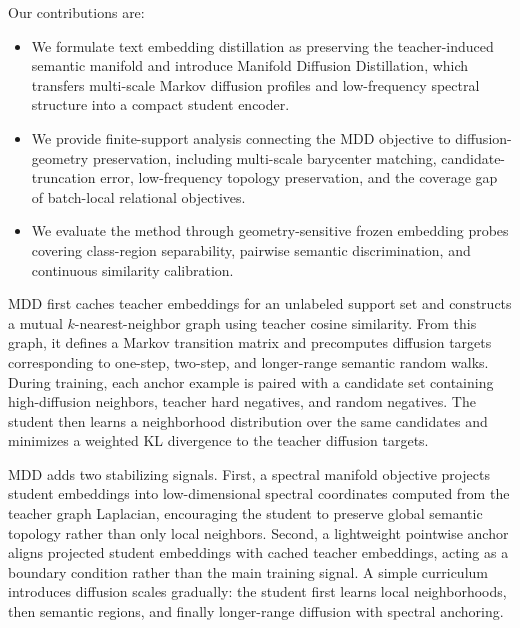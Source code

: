 Our contributions are:
\begin{itemize}
    \item We formulate text embedding distillation as preserving the teacher-induced semantic manifold and introduce Manifold Diffusion Distillation, which transfers multi-scale Markov diffusion profiles and low-frequency spectral structure into a compact student encoder.
    \item We provide finite-support analysis connecting the MDD objective to diffusion-geometry preservation, including multi-scale barycenter matching, candidate-truncation error, low-frequency topology preservation, and the coverage gap of batch-local relational objectives.
    \item We evaluate the method through geometry-sensitive frozen embedding probes covering class-region separability, pairwise semantic discrimination, and continuous similarity calibration.
\end{itemize}

MDD first caches teacher embeddings for an unlabeled support set and constructs a mutual $k$-nearest-neighbor graph using teacher cosine similarity. From this graph, it defines a Markov transition matrix and precomputes diffusion targets corresponding to one-step, two-step, and longer-range semantic random walks. During training, each anchor example is paired with a candidate set containing high-diffusion neighbors, teacher hard negatives, and random negatives. The student then learns a neighborhood distribution over the same candidates and minimizes a weighted KL divergence to the teacher diffusion targets.

MDD adds two stabilizing signals. First, a spectral manifold objective projects student embeddings into low-dimensional spectral coordinates computed from the teacher graph Laplacian, encouraging the student to preserve global semantic topology rather than only local neighbors. Second, a lightweight pointwise anchor aligns projected student embeddings with cached teacher embeddings, acting as a boundary condition rather than the main training signal. A simple curriculum introduces diffusion scales gradually: the student first learns local neighborhoods, then semantic regions, and finally longer-range diffusion with spectral anchoring.
